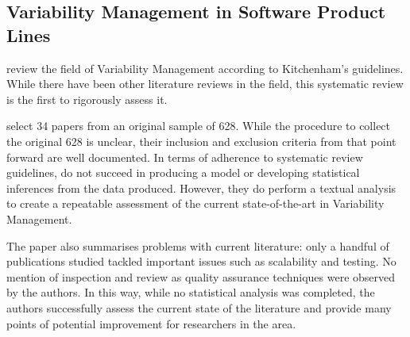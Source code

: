 \subsection{Variability Management in Software Product Lines}
\citet*{Chen2007} review the field of Variability Management according to Kitchenham's guidelines. While there have been other literature reviews in the field, this systematic review is the first to rigorously assess it.\par

\citeauthor{Chen2007} select 34 papers from an original sample of 628. While the procedure to collect the original 628 is unclear, their inclusion and exclusion criteria from that point forward are well documented. In terms of adherence to systematic review guidelines, \citeauthor{Chen2007} do not succeed in producing a model or developing statistical inferences from the data produced. However, they do perform a textual analysis to create a repeatable assessment of the current state-of-the-art in Variability Management.\par

The paper also summarises problems with current literature: only a handful of publications studied tackled important issues such as scalability and testing. No mention of inspection and review as quality assurance techniques were observed by the authors. In this way, while no statistical analysis was completed, the authors successfully assess the current state of the literature and provide many points of potential improvement for researchers in the area.\par

